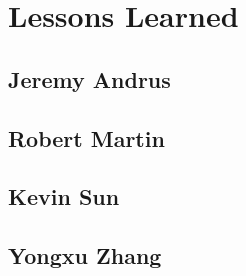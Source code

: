\chapter{Lessons Learned}
\label{chap:lessons}

\section{Jeremy Andrus}


\section{Robert Martin}


\section{Kevin Sun}


\section{Yongxu Zhang}


